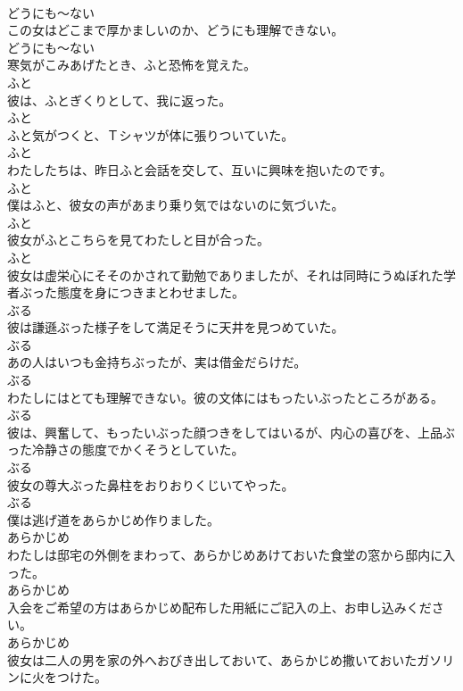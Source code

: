 \documentclass[8pt]{extreport}
\begin{document}
\begin{CJK}{UTF8}{min}
\\	どうにも～ない
\\	この女はどこまで厚かましいのか、どうにも理解できない。	
\\	どうにも～ない
\\	寒気がこみあげたとき、ふと恐怖を覚えた。	
\\	ふと
\\	彼は、ふとぎくりとして、我に返った。	
\\	ふと
\\	ふと気がつくと、Ｔシャツが体に張りついていた。	
\\	ふと
\\	わたしたちは、昨日ふと会話を交して、互いに興味を抱いたのです。	
\\	ふと
\\	僕はふと、彼女の声があまり乗り気ではないのに気づいた。	
\\	ふと
\\	彼女がふとこちらを見てわたしと目が合った。	
\\	ふと
\\	彼女は虚栄心にそそのかされて勤勉でありましたが、それは同時にうぬぼれた学者ぶった態度を身につきまとわせました。	
\\	ぶる
\\	彼は謙遜ぶった様子をして満足そうに天井を見つめていた。	
\\	ぶる
\\	あの人はいつも金持ちぶったが、実は借金だらけだ。	
\\	ぶる
\\	わたしにはとても理解できない。彼の文体にはもったいぶったところがある。	
\\	ぶる
\\	彼は、興奮して、もったいぶった顔つきをしてはいるが、内心の喜びを、上品ぶった冷静さの態度でかくそうとしていた。	
\\	ぶる
\\	彼女の尊大ぶった鼻柱をおりおりくじいてやった。	
\\	ぶる
\\	僕は逃げ道をあらかじめ作りました。	
\\	あらかじめ
\\	わたしは邸宅の外側をまわって、あらかじめあけておいた食堂の窓から邸内に入った。	
\\	あらかじめ
\\	入会をご希望の方はあらかじめ配布した用紙にご記入の上、お申し込みください。	
\\	あらかじめ
\\	彼女は二人の男を家の外へおびき出しておいて、あらかじめ撒いておいたガソリンに火をつけた。	

\end{CJK}
\end{document}
